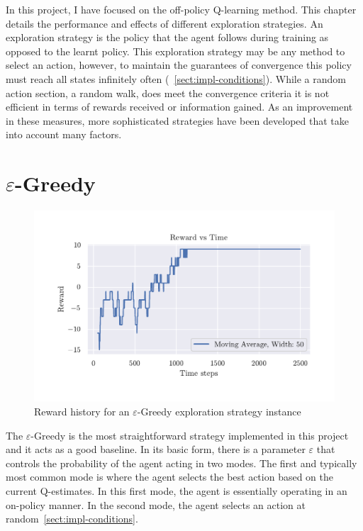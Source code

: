 \documentclass[]{final_report}
\begin{document}
In this project, I have focused on the off-policy Q-learning method. This chapter details the performance and effects of different exploration strategies. An exploration strategy is the policy that the agent follows during training as opposed to the learnt policy. This exploration strategy may be any method to select an action, however, to maintain the guarantees of convergence this policy must reach all states infinitely often (~\ref{sect:impl-conditions}). While a random action section, a random walk, does meet the convergence criteria it is not efficient in terms of rewards received or information gained. As an improvement in these measures, more sophisticated strategies have been developed that take into account many factors.

\newpage
\section{\texorpdfstring{$\varepsilon$}{Lg}-Greedy}

\begin{figure}[H]
  \centering
  
  \includegraphics[trim={0 1cm 0 1cm},clip,width=\textwidth]{reward-history/EG.pdf}
  
  \caption{\label{fig:reward-history:eg} Reward history for an $\varepsilon$-Greedy exploration strategy instance}
\end{figure}


The $\varepsilon$-Greedy is the most straightforward strategy implemented in this project and it acts as a good baseline. In its basic form, there is a parameter $\varepsilon$ that controls the probability of the agent acting in two modes. The first and typically most common mode is where the agent selects the best action based on the current Q-estimates. In this first mode, the agent is essentially operating in an on-policy manner. In the second mode, the agent selects an action at random~\ref{sect:impl-conditions}.
\end{document}
